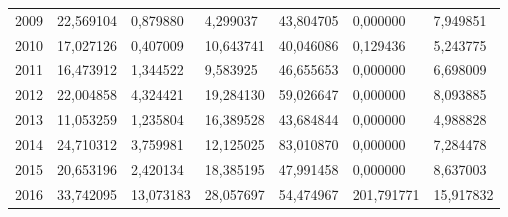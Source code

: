 \begin{table}
\begin{tabular}{p{1cm}p{2cm}p{2cm}p{2cm}p{2cm}p{2cm}p{2cm}}
 2009 &  22,569104 &                   0,879880 &                          4,299037 &                             43,804705 &                               0,000000 &                         7,949851 \\
 2010 &  17,027126 &                   0,407009 &                         10,643741 &                             40,046086 &                               0,129436 &                         5,243775 \\
 2011 &  16,473912 &                   1,344522 &                          9,583925 &                             46,655653 &                               0,000000 &                         6,698009 \\
 2012 &  22,004858 &                   4,324421 &                         19,284130 &                             59,026647 &                               0,000000 &                         8,093885 \\
 2013 &  11,053259 &                   1,235804 &                         16,389528 &                             43,684844 &                               0,000000 &                         4,988828 \\
 2014 &  24,710312 &                   3,759981 &                         12,125025 &                             83,010870 &                               0,000000 &                         7,284478 \\
 2015 &  20,653196 &                   2,420134 &                         18,385195 &                             47,991458 &                               0,000000 &                         8,637003 \\
 2016 &  33,742095 &                  13,073183 &                         28,057697 &                             54,474967 &                             201,791771 &                        15,917832 \\
\bottomrule
\end{tabular}
\end{table}
